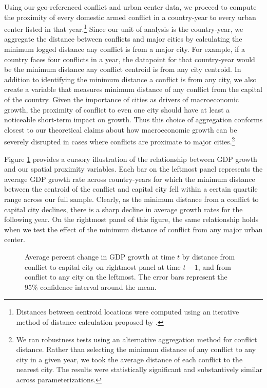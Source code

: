 Using our geo-referenced conflict and urban center data, we proceed to compute the proximity of every domestic armed conflict in a country-year to every urban center listed in that year.\footnote{Distances between centroid locations were computed using an iterative method of distance calculation proposed by \citet{vincenty:1975}.} Since our unit of analysis is the country-year, we aggregate the distance between conflicts and major cities by calculating the minimum logged distance any conflict is from a major city. For example, if a country faces four conflicts in a year, the datapoint for that country-year would be the minimum distance any conflict centroid is from any city centroid. In addition to identifying the minimum distance a conflict is from any city, we also create a variable that measures minimum distance of any conflict from the capital of the country. Given the importance of cities as drivers of macroeconomic growth, the proximity of conflict to even one city should have at least a noticeable short-term impact on growth. Thus this choice of aggregation conforms closest to our theoretical claims about how macroeconomic growth can be severely disrupted in cases where conflicts are proximate to major cities.\footnote{We ran robustness tests using an alternative aggregation method for conflict distance. Rather than selecting the minimum distance of any conflict to any city in a given year, we took the average distance of each conflict to the nearest city. The results were statistically significant and substantively similar across parameterizations.}

Figure \ref{fig:distGdp} provides a cursory illustration of the relationship between GDP growth and our spatial proximity variables. Each bar on the leftmost panel represents the average GDP growth rate across country-years for which the minimum distance between the centroid of the conflict and capital city fell within a certain quartile range across our full sample. Clearly, as the minimum distance from a conflict to capital city declines, there is a sharp decline in average growth rates for the following year. On the rightmost panel of this figure, the same relationship holds when we test the effect of the minimum distance of conflict from any major urban center. 

\begin{figure}
	\centering
	\resizebox{.8\textwidth}{!}{}
	\caption{Average percent change in GDP growth at time $t$ by distance from conflict to capital city on rightmost panel at time $t-1$, and from conflict to any city on the leftmost. The error bars represent the 95\% confidence interval around the mean.}
	\label{fig:distGdp}
\end{figure}

